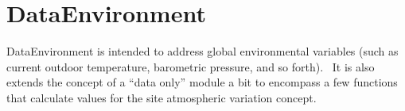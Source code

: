 \section{DataEnvironment}\label{dataenvironment}

DataEnvironment is intended to address global environmental variables (such as current outdoor temperature, barometric pressure, and so forth).~ It is also extends the concept of a ``data only'' module a bit to encompass a few functions that calculate values for the site atmospheric variation concept.
